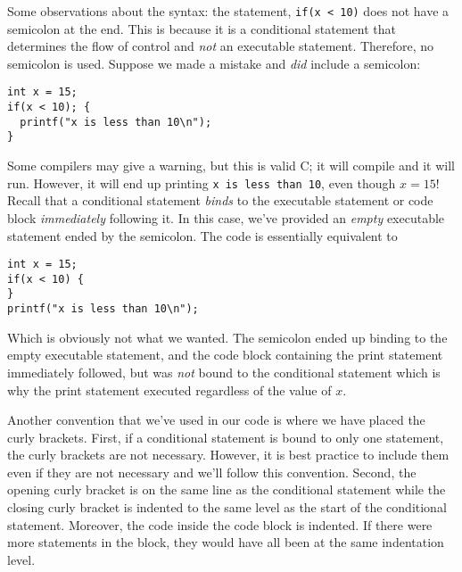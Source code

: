 Some observations about the syntax: the statement, \texttt{if(x < 10)}
does not have a semicolon at the end.  This is because it is a conditional statement
that determines the flow of control and \emph{not} an executable statement.  
Therefore, no semicolon is used.  Suppose we made a mistake and \emph{did}
include a semicolon:

\begin{verbatim}
int x = 15;
if(x < 10); {
  printf("x is less than 10\n");
}
\end{verbatim}

Some compilers may give a warning, but this is valid C; it will compile and it 
will run.  However, it will end up printing \texttt{x is less than 10}, even
though $x = 15$!  Recall that a conditional statement \emph{binds} to the 
executable statement or code block \emph{immediately} following it.  In this
case, we've provided an \emph{empty} executable statement ended by the
semicolon.  The code is essentially equivalent to 

\begin{verbatim}
int x = 15;
if(x < 10) {
}
printf("x is less than 10\n");
\end{verbatim}

Which is obviously not what we wanted.  The semicolon ended up binding 
to the empty executable statement, and the code block containing the
print statement immediately followed, but was \emph{not} bound to the
conditional statement which is why the print statement executed regardless
of the value of $x$.

Another convention that we've used in our code is where we have placed the
curly brackets.  First, if a conditional statement is bound to only one statement, 
the curly brackets are not necessary.  However, it is best practice to include them
even if they are not necessary and we'll follow this convention.  Second, the
opening curly bracket is on the same line as the conditional statement while
the closing curly bracket is indented to the same level as the start of the
conditional statement.  Moreover, the code inside the code block is indented.
If there were more statements in the block, they would have all been at the
same indentation level.

